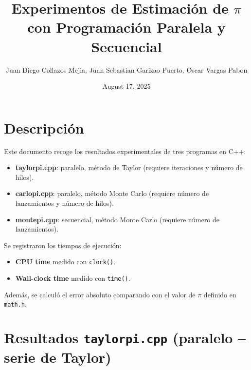 \documentclass[a4paper,12pt]{article}
\title{Experimentos de Estimación de $\pi$ con Programación Paralela y Secuencial}
\author{Juan Diego Collazos Mejia, Juan Sebastian Garizao Puerto, Oscar Vargas Pabon}
\date{August 17, 2025}
\begin{document}
\maketitle

\section*{Descripción}
Este documento recoge los resultados experimentales de tres programas en C++:
\begin{itemize}
    \item \textbf{taylorpi.cpp}: paralelo, método de Taylor (requiere iteraciones y número de hilos).
    \item \textbf{carlopi.cpp}: paralelo, método Monte Carlo (requiere número de lanzamientos y número de hilos).
    \item \textbf{montepi.cpp}: secuencial, método Monte Carlo (requiere número de lanzamientos).
\end{itemize}

Se registraron los tiempos de ejecución:
\begin{itemize}
    \item \textbf{CPU time} medido con \texttt{clock()}.
    \item \textbf{Wall-clock time} medido con \texttt{time()}.
\end{itemize}
Además, se calculó el error absoluto comparando con el valor de \(\pi\) definido en \texttt{math.h}.

\newpage

\section*{Resultados \texttt{taylorpi.cpp} (paralelo -- serie de Taylor)}
\end{document}
